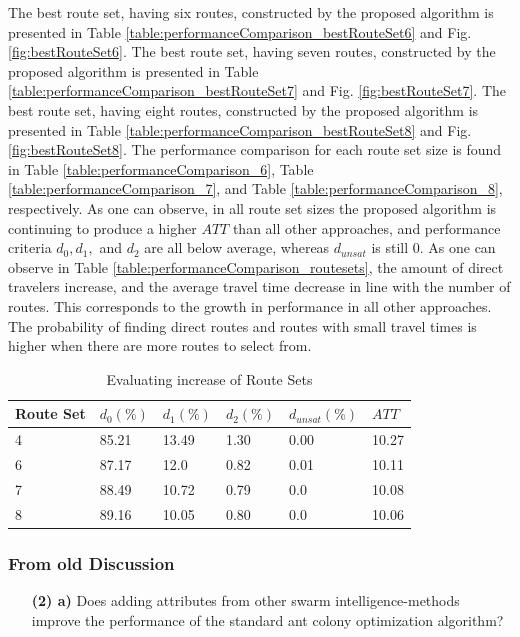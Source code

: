 The best route set, having six routes, constructed by the proposed algorithm is presented in Table \vref{table:performanceComparison_bestRouteSet6} and Fig. \vref{fig:bestRouteSet6}. The best route set, having seven routes, constructed by the proposed algorithm is presented in Table \vref{table:performanceComparison_bestRouteSet7} and Fig. \vref{fig:bestRouteSet7}. The best route set, having eight routes, constructed by the proposed algorithm is presented in Table \vref{table:performanceComparison_bestRouteSet8} and Fig. \vref{fig:bestRouteSet8}. The performance comparison for each route set size is found in Table \vref{table:performanceComparison_6}, Table \vref{table:performanceComparison_7}, and Table \vref{table:performanceComparison_8}, respectively. As one can observe, in all route set sizes the proposed algorithm is continuing to produce a higher $ATT$ than all other approaches, and performance criteria $d_0, d_1,$ and $d_{2}$ are all below average, whereas $d_{unsat}$ is still 0. As one can observe in Table \vref{table:performanceComparison_routesets}, the amount of direct travelers increase, and the average travel time decrease in line with the number of routes. This corresponds to the growth in performance in all other approaches. The probability of finding direct routes and routes with small travel times is higher when there are more routes to select from. 

 \begin{table}[H]
    \centering
    \begin{tabular}{|l||l|l|l|l|l|}
    \hline
    Route Set & $d_0(\%)$ & $d_1(\%)$ & $d_2(\%)$ & $d_{unsat}(\%)$ & $ATT$ \\
    \hline
    4 & 85.21 & 13.49 & 1.30 & 0.00 & 10.27\\
    6 & 87.17 & 12.0 & 0.82 & 0.01 & 10.11\\
    7 & 88.49 & 10.72 & 0.79 & 0.0 & 10.08\\
    8 & 89.16 & 10.05 & 0.80 & 0.0 & 10.06\\
    \hline
    \end{tabular}
    \caption {Evaluating increase of Route Sets}
    \label{table:performanceComparison_routesets}
\end{table}


\subsubsection{From old Discussion}

\begin{itemize}
\item[\textbf{(2) a)}] Does adding attributes from other swarm intelligence-methods improve the performance of the standard ant colony optimization algorithm?
\end{itemize}

